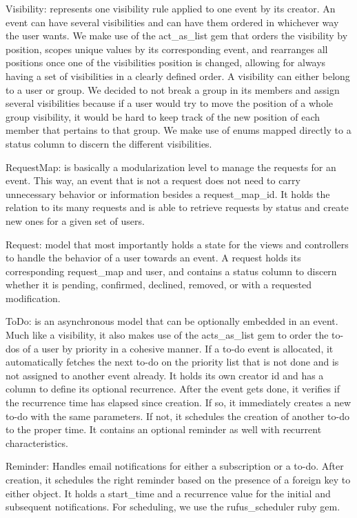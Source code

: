 \documentclass[11pt]{article}
\begin{document}
\begin{list_type}
  \item Visibility: represents one visibility rule applied to one event by its creator. An event can have several visibilities and can have them ordered in whichever way the user wants. We make use of the act_as_list gem that orders the visibility by position, scopes unique values by its corresponding event, and rearranges all positions once one of the visibilities position is changed, allowing for always having a set of visibilities in a clearly defined order. A visibility can either belong to a user or group. We decided to not break a group in its members and assign several visibilities because if a user would try to move the position of a whole group visibility, it would be hard to keep track of the new position of each member that pertains to that group. We make use of enums mapped directly to a status column to discern the different visibilities.
  \item RequestMap: is basically a modularization level to manage the requests for an event. This way, an event that is not a request does not need to carry unnecessary behavior or information besides a request_map_id. It holds the relation to its many requests and is able to retrieve requests by status and create new ones for a given set of users.
  \item Request: model that most importantly holds a state for the views and controllers to handle the behavior of a user towards an event. A request holds its corresponding request_map and user, and contains a status column to discern whether it is pending, confirmed, declined, removed, or with a requested modification.
  \item ToDo: is an asynchronous model that can be optionally embedded in an event. Much like a visibility, it also makes use of the acts_as_list gem to order the to-dos of a user by priority in a cohesive manner. If a to-do event is allocated, it automatically fetches the next to-do on the priority list that is not done and is not assigned to another event already. It holds its own creator id and has a column to define its optional recurrence. After the event gets done, it verifies if the recurrence time has elapsed since creation. If so, it immediately creates a new to-do with the same parameters. If not, it schedules the creation of another to-do to the proper time. It contains an optional reminder as well with recurrent characteristics.
  \item Reminder: Handles email notifications for either a subscription or a to-do. After creation, it schedules the right reminder based on the presence of a foreign key to either object. It holds a start_time and a recurrence value for the initial and subsequent notifications. For scheduling, we use the rufus_scheduler ruby gem.

\end{list_type}
\end{document}

